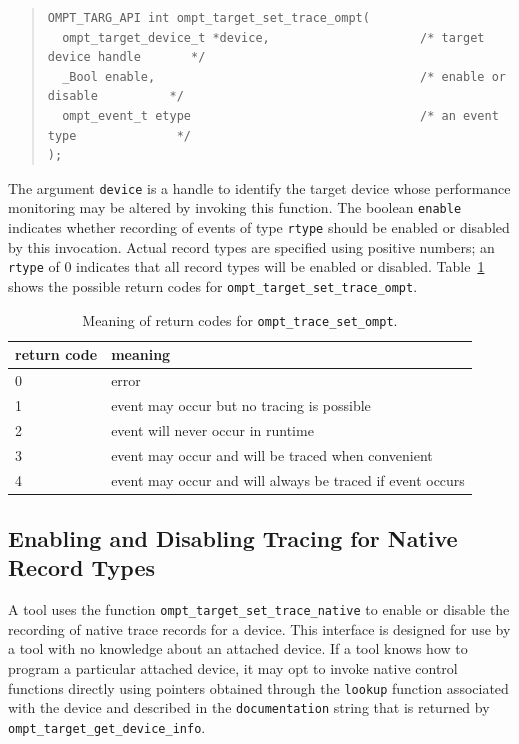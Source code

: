 \documentclass{article}
\begin{document}
\begin{quote}
\begin{verbatim}
OMPT_TARG_API int ompt_target_set_trace_ompt(
  ompt_target_device_t *device,                     /* target device handle       */
  _Bool enable,                                     /* enable or disable          */
  ompt_event_t etype                                /* an event type              */
);
\end{verbatim}
\end{quote}
The argument \verb|device| is a handle to identify the target device whose performance monitoring may be altered by invoking this function. 
The boolean \verb|enable| indicates whether recording of events of type \verb|rtype| should be enabled or disabled by this invocation.
Actual record types are specified using positive numbers; an \verb|rtype| of 0 indicates that all record types will be enabled or disabled.
Table~\ref{table:record_set} shows the possible return codes for \verb|ompt_target_set_trace_ompt|.
\begin{table}
\centering
\begin{tabular}{|l|l|}
\hline
return code & meaning \\\hline
0 & error\\\hline
1 & event may occur but no tracing is possible\\\hline
2 & event will never occur in runtime\\\hline
3 & event may occur and will be traced  when convenient\\\hline
4 & event may occur and will always be traced if event occurs\\\hline
\end{tabular}
\caption{Meaning of return codes for {\tt ompt\_trace\_set\_ompt}.}
\label{table:record_set}
\end{table}




\subsection{Enabling and Disabling Tracing for Native Record Types}
\label{sec:trace-event-native}
A tool uses the function \verb|ompt_target_set_trace_native| to enable or disable the recording of native trace records for a device. This interface is designed for use by a tool with no 
knowledge about an attached device. If a tool knows how to program a particular attached device, it may opt to invoke native control functions directly using pointers obtained through the \verb|lookup| function associated with the device and described in the \verb|documentation| string that is returned by \verb|ompt_target_get_device_info|.
\end{document}
